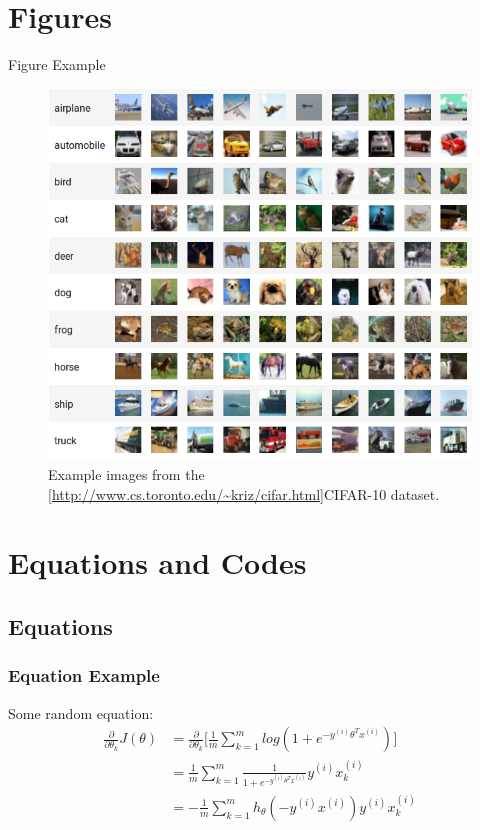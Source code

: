 \documentclass{if-beamer}
\begin{document}
\section{Figures}

\begin{frame}{Figure Example} 

\begin{figure}
\centering
\includegraphics[scale=0.25]{cifar10.png}
\caption{Example images from the \cref{http://www.cs.toronto.edu/~kriz/cifar.html}{CIFAR-10} dataset.}
\end{figure}

\end{frame}

\section{Equations and Codes}
\subsection{Equations}
\begin{frame}
\frametitle{Equation Example}

\begin{block}{Some random equation:}
\begin{align*}
    \frac{\partial}{\partial \theta_k}J(\theta) 
        &= \frac{\partial}{\partial \theta_k}\Bigg[\frac{1}{m}\sum_{k=1}^m log(1+e^{-y^{(i)}\theta^Tx^{(i)}})\Bigg] \\
        &= \frac{1}{m}\sum_{k=1}^m \frac{1}{1+e^{-y^{(i)}\theta^Tx^{(i)}}}y^{(i)}x_k^{(i)} \\
        &= -\frac{1}{m}\sum_{k=1}^m h_\theta(-y^{(i)}x^{(i)})y^{(i)}x_k^{(i)}        
\end{align*}
\end{block}

\end{frame}
\end{document}
